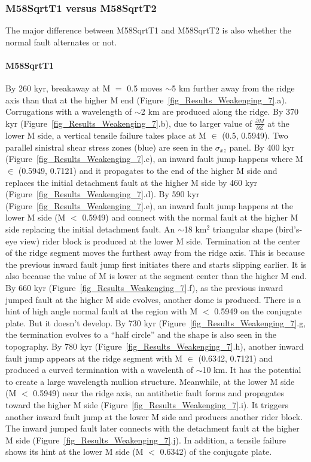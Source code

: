 \documentclass[draft,gc]{agutex}
\begin{document}
\begin{article}
\subsubsection{M58SqrtT1 versus M58SqrtT2}
The major difference between M58SqrtT1 and M58SqrtT2 is also whether the normal fault alternates or not.
\paragraph{M58SqrtT1}\label{para_M58SqrtT1}
By 260 kyr, breakaway at M $=$ 0.5 moves $\sim$5 km further away from the ridge axis than that at the higher M end (Figure~\ref{fig_Results_Weakenging_7}.a). Corrugations with a wavelength of $\sim$2 km are produced along the ridge. By 370 kyr (Figure~\ref{fig_Results_Weakenging_7}.b), due to larger value of $\frac{\partial M}{\partial Z}$ at the lower M side, a vertical tensile failure takes place at M $\in$ (0.5, 0.5949). Two parallel sinistral shear stress zones (blue) are seen in the $\sigma_{xz}$ panel. By 400 kyr (Figure~\ref{fig_Results_Weakenging_7}.c), an inward fault jump happens where M $\in$ (0.5949, 0.7121) and it propagates to the end of the higher M side and replaces the initial detachment fault at the higher M side by 460 kyr (Figure~\ref{fig_Results_Weakenging_7}.d). By 590 kyr (Figure~\ref{fig_Results_Weakenging_7}.e), an inward fault jump happens at the lower M side (M $<$ 0.5949) and connect with the normal fault at the higher M side replacing the initial detachment fault. An $\sim$18 km$^{2}$ triangular shape (bird's-eye view) rider block is produced at the lower M side. Termination at the center of the ridge segment moves the furthest away from the ridge axis. This is because the previous inward fault jump first initiates there and starts slipping earlier. It is also because the value of M is lower at the segment center than the higher M end. By 660 kyr (Figure~\ref{fig_Results_Weakenging_7}.f), as the previous inward jumped fault at the higher M side evolves, another dome is produced. There is a hint of high angle normal fault at the region with M $<$ 0.5949 on the conjugate plate. But it doesn't develop. By 730 kyr (Figure~\ref{fig_Results_Weakenging_7}.g, the termination evolves to a ``half circle'' and the shape is also seen in the topography. By 780 kyr (Figure~\ref{fig_Results_Weakenging_7}.h), another inward fault jump appears at the ridge segment with M $\in$ (0.6342, 0.7121) and produced a curved termination with a wavelenth of $\sim$10 km. It has the potential to create a large wavelength mullion structure. Meanwhile, at the lower M side (M $<$ 0.5949) near the ridge axis, an antithetic fault forms and propagates toward the higher M side (Figure~\ref{fig_Results_Weakenging_7}.i). It triggers another inward fault jump at the lower M side and produces another rider block. The inward jumped fault later connects with the detachment fault at the higher M side (Figure~\ref{fig_Results_Weakenging_7}.j). In addition, a tensile failure shows its hint at the lower M side (M $<$ 0.6342) of the conjugate plate.


\end{article}
\end{document}
